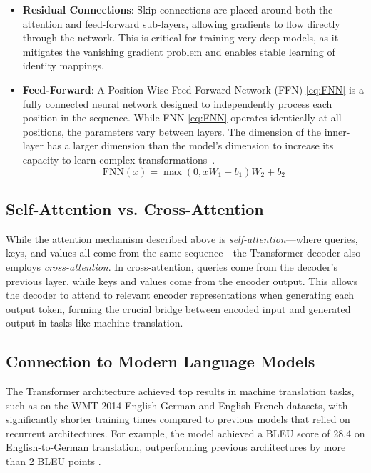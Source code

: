\begin{itemize}
    \item \textbf{Residual Connections}: Skip connections are placed around both the attention and feed-forward sub-layers, allowing gradients to flow directly through the network. This is critical for training very deep models, as it mitigates the vanishing gradient problem and enables stable learning of identity mappings.

    \item \textbf{Feed-Forward}:  A Position-Wise Feed-Forward Network (FFN) \ref{eq:FNN} is a fully connected neural network designed to independently process each position in the sequence.  While FNN \ref{eq:FNN} operates identically at all positions, the parameters vary between layers. The dimension of the inner-layer has a larger dimension than the model's dimension to increase its capacity to learn complex transformations~\cite{vaswani2017attention}.
    \begin{equation}
        \label{eq:FNN}
        \text{FNN}(x) = \max(0,xW_1+b_1)W_2+b_2
    \end{equation}
\end{itemize}

\subsection{Self-Attention vs. Cross-Attention}
While the attention mechanism described above is \textit{self-attention}—where queries, keys, and values all come from the same sequence—the Transformer decoder also employs \textit{cross-attention}. In cross-attention, queries come from the decoder's previous layer, while keys and values come from the encoder output. This allows the decoder to attend to relevant encoder representations when generating each output token, forming the crucial bridge between encoded input and generated output in tasks like machine translation.

\subsection{Connection to Modern Language Models}  
The Transformer architecture achieved top results in machine translation tasks, such as on the WMT 2014 English-German and English-French datasets, with significantly shorter training times compared to previous models that relied on recurrent architectures. For example, the model achieved a BLEU score of 28.4 on English-to-German translation, outperforming previous architectures by more than 2 BLEU points \cite{vaswani2017attention}.

